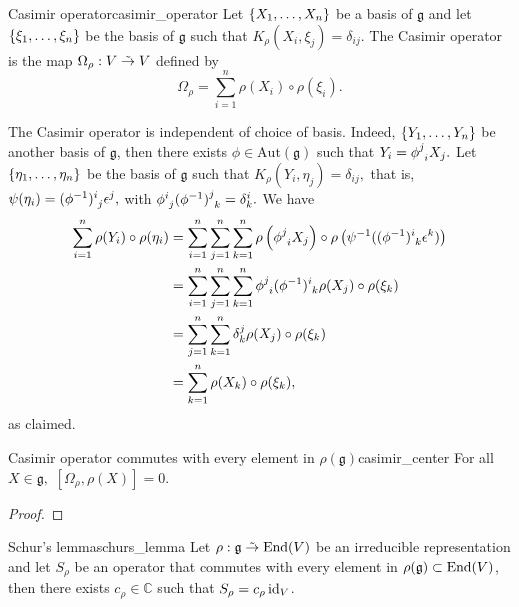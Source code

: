 \begin{definition}{Casimir operator}{casimir_operator}
    Let \(\{X_1, \dots, X_n\}\) be a basis of \(\mathfrak{g}\) and let \(\{\xi_1, \dots, \xi_n\}\) be the basis of \(\mathfrak{g}\) such that \(K_\rho(X_i, \xi_j) = \delta_{ij}.\) The Casimir operator is the map \(\Omega_\rho: V \mathrel{\tilde{\to}} V\) defined by
    \begin{equation*}
        \Omega_\rho = \sum_{i = 1}^{n} \rho(X_i) \circ \rho(\xi_i).
    \end{equation*}
\end{definition}
\begin{remark}
    The Casimir operator is independent of choice of basis. Indeed, \(\{Y_1, \dots, Y_n\}\) be another basis of \(\mathfrak{g}\), then there exists \(\phi \in \mathrm{Aut}(\mathfrak{g})\) such that \(Y_i = \phi\indices{^j_i}X_j.\) Let \(\{\eta_1, \dots, \eta_n\}\) be the basis of \(\mathfrak{g}\) such that \(K_\rho(Y_i, \eta_j) = \delta_{ij},\) that is, \(\psi(\eta_i) = (\phi^{-1})\indices{^i_j}\epsilon^j,\) with \(\phi\indices{^i_j}(\phi^{-1})\indices{^j_k} = \delta^i_k.\) We have
    \begin{align*}
        \sum_{i = 1}^n \rho(Y_i)\circ \rho(\eta_i) &= \sum_{i=1}^n \sum_{j=1}^n\sum_{k=1}^n \rho\left(\phi\indices{^j_i}X_j\right) \circ \rho\left(\psi^{-1}((\phi^{-1})\indices{^i_k}\epsilon^k)\right)\\
                                                   &= \sum_{i=1}^n \sum_{j=1}^n \sum_{k=1}^n \phi\indices{^j_i} (\phi^{-1})\indices{^i_k} \rho(X_j) \circ \rho(\xi_k)\\
                                                   &= \sum_{j=1}^n \sum_{k=1}^n \delta^j_k \rho(X_j)\circ \rho(\xi_k)\\
                                                   &= \sum_{k=1}^n \rho(X_k) \circ \rho(\xi_k),
    \end{align*}
    as claimed.
\end{remark}

\begin{theorem}{Casimir operator commutes with every element in \(\rho(\mathfrak{g})\)}{casimir_center}
    For all \(X \in \mathfrak{g},\) \([\Omega_\rho, \rho(X)] = 0\).
\end{theorem}
\begin{proof}
    \todo
\end{proof}

\begin{lemma}{Schur's lemma}{schurs_lemma}
    Let \(\rho : \mathfrak{g} \mathrel{\tilde{\to}} \operatorname{End}(V)\) be an irreducible representation and let \(S_\rho\) be an operator that commutes with every element in \(\rho(\mathfrak{g})\subset \operatorname{End}(V)\), then there exists \(c_\rho \in \mathbb{C}\) such that \(S_\rho = c_\rho \operatorname{id}_{V}\).
\end{lemma}

